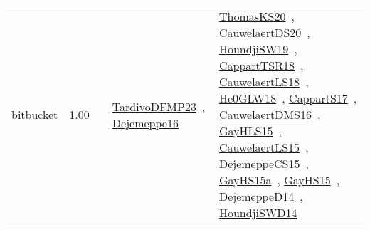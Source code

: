 {\begin{longtable}{p{3cm}r>{\raggedright\arraybackslash}p{6cm}>{\raggedright\arraybackslash}p{6cm}>{\raggedright\arraybackslash}p{8cm}}
\index{bitbucket}\index{Benchmarks!bitbucket}bitbucket &  1.00 &  & \href{../works/TardivoDFMP23.pdf}{TardivoDFMP23}~\cite{TardivoDFMP23}, \href{../works/Dejemeppe16.pdf}{Dejemeppe16}~\cite{Dejemeppe16} & \href{../works/ThomasKS20.pdf}{ThomasKS20}~\cite{ThomasKS20}, \href{../works/CauwelaertDS20.pdf}{CauwelaertDS20}~\cite{CauwelaertDS20}, \href{../works/HoundjiSW19.pdf}{HoundjiSW19}~\cite{HoundjiSW19}, \href{../works/CappartTSR18.pdf}{CappartTSR18}~\cite{CappartTSR18}, \href{../works/CauwelaertLS18.pdf}{CauwelaertLS18}~\cite{CauwelaertLS18}, \href{../works/He0GLW18.pdf}{He0GLW18}~\cite{He0GLW18}, \href{../works/CappartS17.pdf}{CappartS17}~\cite{CappartS17}, \href{../works/CauwelaertDMS16.pdf}{CauwelaertDMS16}~\cite{CauwelaertDMS16}, \href{../works/GayHLS15.pdf}{GayHLS15}~\cite{GayHLS15}, \href{../works/CauwelaertLS15.pdf}{CauwelaertLS15}~\cite{CauwelaertLS15}, \href{../works/DejemeppeCS15.pdf}{DejemeppeCS15}~\cite{DejemeppeCS15}, \href{../works/GayHS15a.pdf}{GayHS15a}~\cite{GayHS15a}, \href{../works/GayHS15.pdf}{GayHS15}~\cite{GayHS15}, \href{../works/DejemeppeD14.pdf}{DejemeppeD14}~\cite{DejemeppeD14}, \href{../works/HoundjiSWD14.pdf}{HoundjiSWD14}~\cite{HoundjiSWD14}\\

\end{longtable}}
